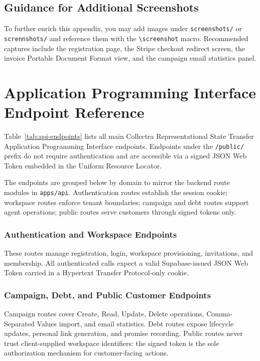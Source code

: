 ﻿\documentclass[12pt,a4paper]{report}
\begin{document}
\section{Guidance for Additional Screenshots}

To further enrich this appendix, you may add images under \texttt{screenshots/} or
\texttt{scrennshots/} and reference them with the \texttt{\textbackslash screenshot} macro.
Recommended captures include the registration page, the Stripe checkout redirect screen,
the invoice Portable Document Format view, and the campaign email statistics panel.

\chapter{Application Programming Interface Endpoint Reference}
\label{app:api}

Table~\ref{tab:api-endpoints} lists all main Collectra Representational State Transfer Application Programming Interface endpoints.
Endpoints under the \texttt{/public/} prefix do not require authentication and are
accessible via a signed JSON Web Token embedded in the Uniform Resource Locator.

The endpoints are grouped below by domain to mirror the backend route modules in
\texttt{apps/api}.
Authentication routes establish the session cookie; workspace routes enforce tenant
boundaries; campaign and debt routes support agent operations; public routes serve
customers through signed tokens only.

\subsection{Authentication and Workspace Endpoints}

These routes manage registration, login, workspace provisioning, invitations, and membership.
All authenticated calls expect a valid Supabase-issued JSON Web Token carried in a
Hypertext Transfer Protocol-only cookie.

\subsection{Campaign, Debt, and Public Customer Endpoints}

Campaign routes cover Create, Read, Update, Delete operations, Comma-Separated Values import, and email statistics.
Debt routes expose lifecycle updates, personal link generation, and promise recording.
Public routes never trust client-supplied workspace identifiers: the signed token is the sole
authorization mechanism for customer-facing actions.
\end{document}
